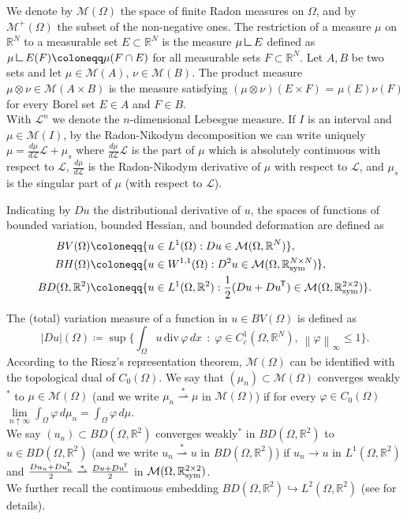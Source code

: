 \documentclass[a4, 11pt, reqno, final]{amsart}
\newcommand{\mres}{\mathbin{\vrule height 1.6ex depth 0pt width
		0.13ex\vrule height 0.13ex depth 0pt width 1.3ex}}
\newcommand{\calL}{\mathcal{L}}
\newcommand{\calM}{\mathcal{M}}
\newcommand{\bbR}{\mathbb{R}}
\newcommand{\n}[1]{\left\|#1\right\|}  %
\newcommand\embed{\hookrightarrow} %
\newcommand\weakstar{\stackrel{\ast }{\rightharpoonup}}  %
\theoremstyle{plain}%
\DeclareMathOperator{\st}{\,:\,}
\renewcommand{\div}{\mathrm{div}\,}
\DeclareMathOperator{\Sym}{\bbR^{2\times 2}_{\rm sym}}
\newcommand*{\tran}{^{\mkern-1.5mu\mathsf{T}}}
\begin{document}
	We denote by $\calM(\Omega)$ the space of finite Radon measures on $\Omega$, and by $\calM^+(\Omega)$ the subset of the non-negative ones.
	The restriction of a measure $\mu$ on $\bbR^N$ to a measurable set $E\subset \bbR^N$ is the measure $\mu\mres E$ defined as $\mu\mres E (F) \coloneqq   \mu(F \cap E)$ for all measurable sets $F\subset \bbR^N$.
	Let $A, B$ be two sets and let $\mu \in \calM(A)$, $\nu \in \calM(B)$. The product measure
	$\mu \otimes \nu \in \calM(A\times B)$  is the measure satisfying $(\mu \otimes \nu) (E\times F)$ = $\mu(E)\nu(F)$ for every Borel set $E \in A$ and $F \in B$.\\
	With $\calL^n$ we denote the $n$-dimensional Lebesgue measure.
	If $I$ is an interval and $\mu \in \calM(I)$, by the Radon-Nikodym decomposition we can write uniquely $\mu = \frac{d\mu}{d\calL}\calL + \mu_s$ where $\frac{d\mu}{d\calL}\calL$ is the part of $\mu$ which is absolutely continuous with respect to $\calL$, $\frac{d\mu}{d\calL}$ is the Radon-Nikodym derivative of $\mu$ with respect to $\calL$, and $\mu_s$ is the singular part of $\mu$ (with respect to $\calL$).


	Indicating by $Du$ the distributional derivative of $u$, the spaces of functions of bounded variation, bounded Hessian, and bounded deformation are defined as
	\begin{equation}\label{eq:bh}
		\begin{aligned}
			BV(\Omega) &\coloneqq   \{u \in L^{1}(\Omega) : Du \in \calM(\Omega,\bbR^N)\},\\
			BH(\Omega) &\coloneqq   \{u \in W^{1,1}(\Omega) : D^2u \in \calM(\Omega,\bbR^{N\times N}_{\mathrm{sym}})\},\\
			BD(\Omega, \bbR^2) &\coloneqq   \{u \in L^{1}(\Omega, \bbR^2) : \frac12(Du + Du\tran) \in \calM(\Omega,\Sym)\}.
		\end{aligned}
	\end{equation}


	The (total) variation measure of a function in $u \in BV(\Omega)$
	is defined as
	$$
	|Du|(\Omega) \coloneqq   \sup \{\int_{\Omega} u\,\div\varphi \,dx \st \varphi \in C^1_c (\Omega,\bbR^N), \ \n{\varphi}_{\infty} \leq 1 \}.
	$$
	According to the Riesz's representation theorem, $\calM(\Omega)$ can be identified with the topological dual of $C_0(\Omega)$.
	We say that $(\mu_n) \subset \calM(\Omega)$ converges weakly$^\ast $ to $\mu\in\calM(\Omega)$ (and we write $\mu_n \weakstar \mu$ in $\calM(\Omega)$) if for every $\varphi\in C_0(\Omega)$ $\lim\limits_{n\uparrow \infty}\int_\Omega \varphi\, d\mu_n = \int_\Omega \varphi \,d\mu$.\\
	We say $(u_n) \subset BD(\Omega, \bbR^2)$ converges weakly$^\ast $ in $BD(\Omega, \bbR^2)$ to $u\in BD(\Omega, \bbR^2)$ (and we write $u_n \weakstar u$ in $BD(\Omega, \bbR^2)$) if $u_n\to u$ in $L^{1}(\Omega, \bbR^2)$ and $\frac{Du_n + Du_n\tran}{2} \weakstar \frac{Du + Du\tran}{2}$ in $\calM(\Omega, \Sym)$.\\
	We further recall
	the continuous embedding $BD(\Omega, \bbR^2)\embed L^2(\Omega, \bbR^2)$ (see \cite{Temam1987} for details).
\end{document}
